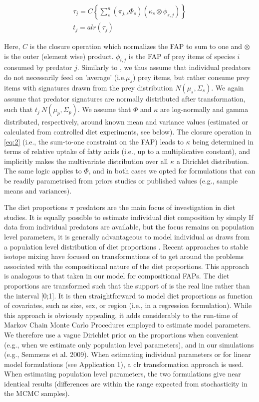 \documentclass[12pt]{article}%
\begin{document}
\begin{spacing}{1.9}
\begin{flushleft}
\begin{align}
\label{eq:2}
\tau_{j} = C \left\{\sum_{s}^n  \left(\pi_{j,s} \Phi_{s} \right) \left(
    \kappa_{s} \otimes \phi_{s,j} \right) \right\}\\
t_j = alr(\tau_{j})

\end{align}

Here, $C$ is the closure operation which normalizes the FAP to sum to
one and $\otimes$ is the outer (element wise) product. $\phi_{i,j}$ is
the FAP of prey items of species $i$ consumed by predator
$j$. Similarly to \citet{parnell_bayesian_2012},
we thus assume that individual predators do not necessarily feed on
'average' (i.e,$\mu_s$) prey items, but rather consume prey items with
signatures drawn from the prey distribution $N(\mu_s,\Sigma_s)$. We
again assume that predator signatures are normally distributed after
transformation, such that $t_j ~ N(\mu_p,\Sigma_p)$. We assume that
$\Phi$ and $\kappa$ are log-normally and gamma
distributed, respectively, around known mean and variance values (estimated or
calculated from controlled diet experiments, see below). The
closure operation in \autoref{eq:2} (i.e., the sum-to-one constraint
on the FAP) leads to $\kappa$ being determined in terms of
relative uptake of fatty acids (i.e., up to a multiplicative
constant), and implicitly makes the multivariate distribution over all $\kappa$ a Dirichlet
distribution. The same logic applies to $\Phi$, and in both cases we
opted for formulations that can be readily parametrised from priors
studies or published values (e.g., sample means and variances).

The diet proportions $\pi$ predators are the main focus of investigation
in diet studies. It is equally possible to estimate individual diet
composition by simply  If data from individual predators are
available, but the focus remains on population level parameters, it is
generally advantageous to model individual  as draws from a population
level distribution of diet proportions . Recent approaches to stable
isotope mixing have focused on transformations of  to get around the
problems associated with the compositional nature of the diet
proportions. This approach is analogous to that taken in our model for
compositional FAPs. The diet proportions are transformed such that the
support of  is the real line rather than the interval [0;1]. It is
then straightforward to model diet proportions as function of
covariates, such as size, sex, or region (i.e., in a regression
formulation). While this approach is obviously appealing, it adds
considerably to the run-time of Markov Chain Monte Carlo Procedures
employed to estimate model parameters. We therefore use a vague
Dirichlet prior on the proportions when convenient (e.g., when we
estimate only population level parameters), and in our simulations
(e.g., Semmens et al. 2009). When estimating individual parameters or
for linear model formulations (see Application 1), a clr
transformation approach is used. When estimating population level
parameters, the two formulations give near identical results
(differences are within the range expected from  stochasticity in the
MCMC samples). 


\end{flushleft}
\end{spacing}
\end{document}
